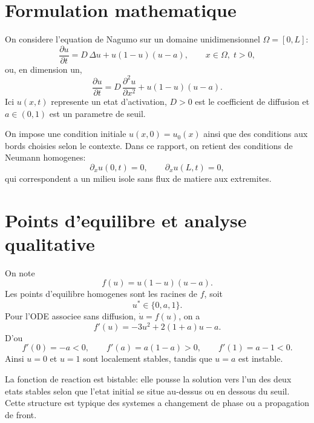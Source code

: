 \documentclass[11pt,a4paper]{report}
\begin{document}
\section{Formulation mathematique}
On considere l'equation de Nagumo sur un domaine unidimensionnel $\Omega=[0,L]$:
\begin{equation}
\frac{\partial u}{\partial t} = D\,\Delta u + u(1-u)(u-a), \qquad x \in \Omega,\; t>0,
\end{equation}
ou, en dimension un,
\begin{equation}
\frac{\partial u}{\partial t} = D\,\frac{\partial^2 u}{\partial x^2} + u(1-u)(u-a).
\end{equation}
Ici $u(x,t)$ represente un etat d'activation, $D>0$ est le coefficient de diffusion
et $a \in (0,1)$ est un parametre de seuil.

On impose une condition initiale $u(x,0)=u_0(x)$ ainsi que des conditions aux bords
choisies selon le contexte. Dans ce rapport, on retient des conditions de Neumann
homogenes:
\begin{equation}
\partial_x u(0,t)=0, \qquad \partial_x u(L,t)=0,
\end{equation}
qui correspondent a un milieu isole sans flux de matiere aux extremites.

\section{Points d'equilibre et analyse qualitative}
On note
\begin{equation}
 f(u)=u(1-u)(u-a).
\end{equation}
Les points d'equilibre homogenes sont les racines de $f$, soit
\begin{equation}
 u^* \in \{0,a,1\}.
\end{equation}
Pour l'ODE associee sans diffusion, $\dot u=f(u)$, on a
\begin{equation}
 f'(u) = -3u^2 + 2(1+a)u - a.
\end{equation}
D'ou
\begin{equation}
 f'(0)=-a<0, \qquad f'(a)=a(1-a)>0, \qquad f'(1)=a-1<0.
\end{equation}
Ainsi $u=0$ et $u=1$ sont localement stables, tandis que $u=a$ est instable.

La fonction de reaction est bistable: elle pousse la solution vers l'un des deux etats
stables selon que l'etat initial se situe au-dessus ou en dessous du seuil.
Cette structure est typique des systemes a changement de phase ou a propagation de front.
\end{document}
